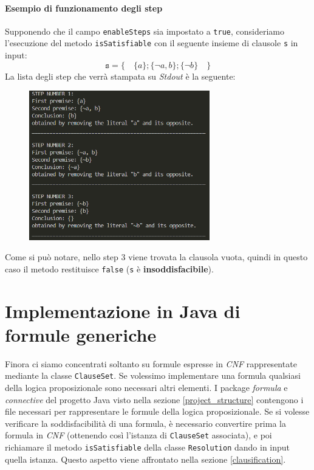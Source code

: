 \documentclass[a4paper,12pt]{report}
\begin{document}
\subsubsection{Esempio di funzionamento degli step}
Supponendo che il campo \texttt{enableSteps} sia impostato a \texttt{true}, consideriamo l'esecuzione del metodo \texttt{isSatisfiable} con il seguente insieme di clausole \texttt{s} in input:
\[\texttt{s} = \{\quad \{a\}; \{\lnot a, b\}; \{\lnot b\} \quad\}\]
La lista degli step che verrà stampata su \emph{Stdout} è la seguente:
\begin{figure}[H]
    \centering
    \includegraphics[width=0.7\textwidth, height=0.4\textheight]{img/step.png}
\end{figure} 
\noindent Come si può notare, nello step 3 viene trovata la clausola vuota, quindi in questo caso il metodo restituisce \texttt{false} (\texttt{s} è \textbf{insoddisfacibile}).


% 
% 
\chapter{Implementazione in Java di formule generiche}
\label{formulas}
Finora ci siamo concentrati soltanto su formule espresse in \emph{CNF} rappresentate mediante la classe \texttt{ClauseSet}. Se volessimo implementare una formula qualsiasi della logica proposizionale sono necessari altri elementi. I package \emph{formula} e \emph{connective} del progetto Java visto nella sezione \ref{project_structure} contengono i file necessari per rappresentare le formule della logica proposizionale. Se si volesse verificare la soddisfacibilità di una formula, è necessario convertire prima la formula in \emph{CNF} (ottenendo così l'istanza di \texttt{ClauseSet} associata), e poi richiamare il metodo \texttt{isSatisfiable} della classe \texttt{Resolution} dando in input quella istanza. Questo aspetto viene affrontato nella sezione \ref{clausification}.
\end{document}
